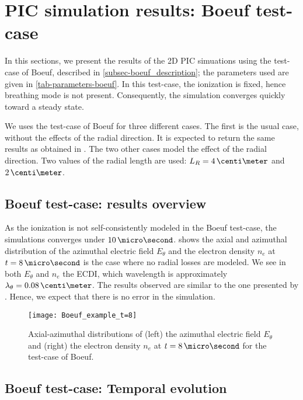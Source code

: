 
\section{PIC simulation results: Boeuf test-case}

  In this sections, we present the results of the \ac{2D} \ac{PIC} simuations using the test-case of Boeuf, described in \cref{subsec-boeuf_description}; the parameters used are given in \vref{tab-parameters-boeuf}.
  In this test-case, the ionization is fixed, hence breathing mode is not present.
  Consequently, the simulation converges quickly toward a steady state.
  
  We uses the test-case of Boeuf for three different cases.
  The first is the usual case, without the effects of the radial direction.
  It is expected to return the same results as obtained in \citet{boeuf2018}.
  The two other cases model the effect of the radial direction.
  Two values of the radial length are used\string: $L_R=4\,\centi\meter$ and $2\,\centi\meter$.

  
  \subsection{Boeuf test-case: results overview} \label{subsec-boeuf-overview}
  As the ionization is not self-consistently modeled in the Boeuf test-case, the simulations converges under $10\,\micro\second$.
   shows the axial and azimuthal distribution of the azimuthal electric field $E_{\theta}$ and the electron density $n_e$ at $t=8\,\micro\second$ is the case where no radial losses are modeled.
  We see in both $E_{\theta}$ and $n_e$ the \ac{ECDI}, which wavelength is approximately $\lambda_{\theta} = 0.08\,\centi\meter$.
  The results observed are similar to the one presented by \citet{boeuf2018}.
  Hence, we expect that there is no error in the simulation.

  \begin{figure}[hbt]
    \centering
    \texttt{[image: Boeuf\_example\_t=8]}
    \caption{ Axial-azimuthal distributions of (left) the azimuthal electric field $E_{\theta}$ and (right) the electron density $n_e$ at $t=8\,\micro\second$ for the test-case of Boeuf. } 
    \label{fig-overview_boeuf_neEx}
  \end{figure}

  \subsection{Boeuf test-case: Temporal evolution} \label{subsec-temp_boeuf}
  
